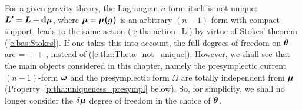 \begin{remark} \label{r:tha:Lagrangian_dep_mu}
For a given gravity theory, the Lagrangian $n$-form itself is not unique:
$\bm{L'} = \bm{L} + \mathbf{d}\bm{\mu}$, where $\bm{\mu} = \bm{\mu}\textbf{(}\bm{g}\textbf{)}$ is an arbitrary $(n-1)$-form with compact
support, leads to the same action (\ref{e:tha:action_L}) by virtue of
Stokes' theorem (\ref{e:bas:Stokes}). If one takes this into account,
the full degrees of freedom on $\bm{\theta}$ are
\be \label{e:tha:Theta_gal_freedom}
     = \w{\theta} + \dd {} + \delta\w{\mu},
\ee
instead of (\ref{e:tha:Theta_not_unique}).
However, we shall see that the main objects considered in this chapter,
namely the presymplectic current $(n-1)$-form $\bm{\omega}$ and
the presymplectic form $\Omega$ are totally independent from $\bm{\mu}$
(Property~\ref{p:tha:uniqueness_presympl} below). So,
for simplicity, we shall no longer consider the $\delta\bm{\mu}$
degree of freedom in the choice of $\bm{\theta}$.
\end{remark}


